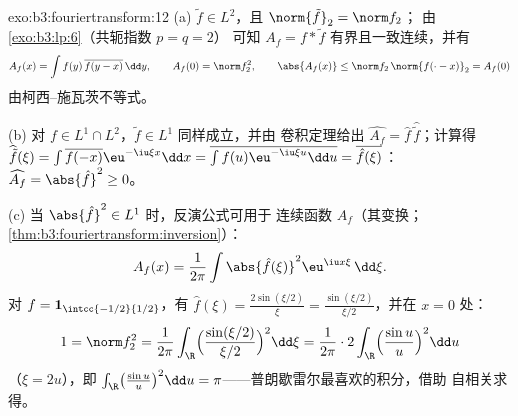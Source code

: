 \begin{solution}{exo:b3:fouriertransform:12}
(a) $\tilde f \in L^2$，且 $\norm{\tilde f}_2 = \norm f_2$；
由 \cref{exo:b3:lp:6}（共轭指数 $p = q = 2$）
可知 $A_f = f * \tilde f$ 有界且一致连续，并有
\[
A_f(x) = \int f(y)\,\overline{f(y - x)}\,\dd y,
\qquad A_f(0) = \norm f_2^2,
\qquad \abs{A_f(x)} \leq \norm f_2\,\norm{f(\cdot -
x)}_2 = A_f(0)
\]
由柯西--施瓦茨不等式。

(b) 对 $f \in L^1\cap L^2$，$\tilde f \in L^1$ 同样成立，并由
卷积定理给出 $\widehat{A_f} = \hat f\,
\widehat{\tilde f}$；计算得 $\widehat{\tilde f}(\xi) =
\int\overline{f(-x)}\eu^{-\iu\xi x}\dd x =
\overline{\int f(u)\eu^{-\iu\xi u}\dd u} =
\overline{\hat f(\xi)}$：$\widehat{A_f} = \abs{\hat f}^2
\geq 0$。

(c) 当 $\abs{\hat f}^2 \in L^1$ 时，反演公式可用于
连续函数 $A_f$（其变换；
\cref{thm:b3:fouriertransform:inversion}）：
\[
A_f(x) = \frac1{2\pi}\int\abs{\hat f(\xi)}^2
\eu^{\iu x\xi}\,\dd\xi .
\]
对 $f = \mathbf 1_{\intcc{-1/2}{1/2}}$，有 $\hat f(\xi) =
\frac{2\sin(\xi/2)}\xi = \frac{\sin(\xi/2)}{\xi/2}$，并在
$x = 0$ 处：
\[
1 = \norm f_2^2 = \frac1{2\pi}\int_\R
\Bigl(\frac{\sin(\xi/2)}{\xi/2}\Bigr)^2\dd\xi
= \frac1{2\pi}\cdot2\int_\R\Bigl(\frac{\sin u}u\Bigr)^2\dd u
\]
（$\xi = 2u$），即 $\int_\R\bigl(\frac{\sin u}u\bigr)^2\dd
u = \pi$——普朗歇雷尔最喜欢的积分，借助
自相关求得。
\end{solution}

